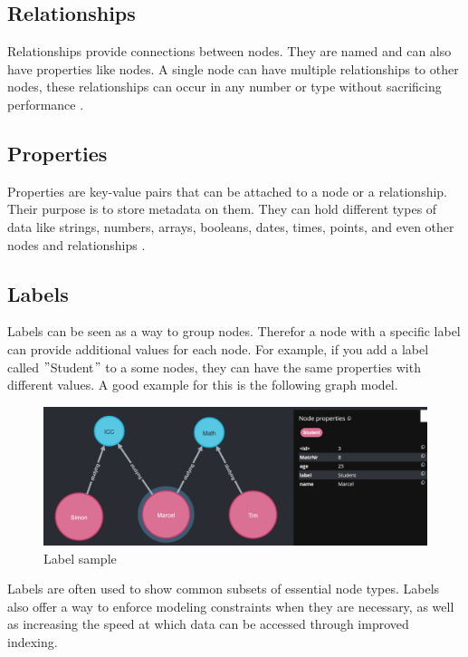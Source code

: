 \subsection{Relationships}\label{subsec:relationships}
Relationships provide connections between nodes.
They are named and can also have properties like nodes.
A single node can have multiple relationships to other nodes, these relationships can occur in any number or type without
sacrificing performance \parencite[compare]{neo4j:allgemeins}.

\subsection{Properties} \label{subsec:properties}
Properties are key-value pairs that can be attached to a node or a relationship.
Their purpose is to store metadata on them.
They can hold different types of data like strings, numbers, arrays, booleans, dates, times, points, and even other nodes and relationships \parencite[compare]{neo4j:Values} \parencite[compare]{neo4j:Graph}.

\subsection{Labels} \label{subsec:labels}
Labels can be seen as a way to group nodes.
Therefor a node with a specific label can provide additional values for each node.
For example, if you add a label called \("\)Student\("\) to a some nodes, they can have the same properties with different values.
A good example for this is the following graph model.
\begin{figure}[!h]
    \centering
    \includegraphics[width=1 \linewidth]{images/labels.png}
    \caption{Label sample} \label{img:labels}
\end{figure}
Labels are often used to show common subsets of essential node types.
Labels also offer a way to enforce modeling constraints when they are necessary, as well as increasing the speed at which data
can be accessed through improved indexing. \parencite[compare P. 6f.]{PractivalNeo4j}

